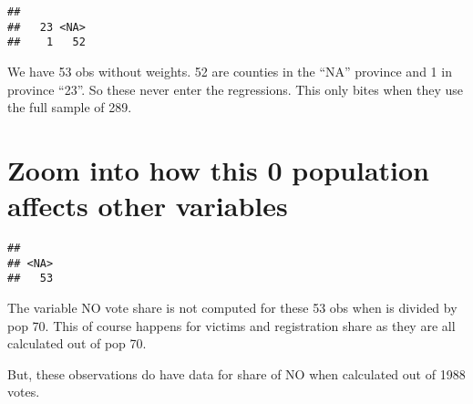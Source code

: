 \documentclass[
]{article}
\newenvironment{Shaded}{\begin{snugshade}}{\end{snugshade}}
\newcommand{\AttributeTok}[1]{\textcolor[rgb]{0.77,0.63,0.00}{#1}}
\newcommand{\DecValTok}[1]{\textcolor[rgb]{0.00,0.00,0.81}{#1}}
\newcommand{\FunctionTok}[1]{\textcolor[rgb]{0.00,0.00,0.00}{#1}}
\newcommand{\NormalTok}[1]{#1}
\newcommand{\SpecialCharTok}[1]{\textcolor[rgb]{0.00,0.00,0.00}{#1}}
\newcommand{\StringTok}[1]{\textcolor[rgb]{0.31,0.60,0.02}{#1}}
\begin{document}
\begin{Shaded}
\end{Shaded}

\begin{verbatim}
## 
##   23 <NA> 
##    1   52
\end{verbatim}

We have 53 obs without weights. 52 are counties in the ``NA'' province
and 1 in province ``23''. So these never enter the regressions. This
only bites when they use the full sample of 289.

\hypertarget{zoom-into-how-this-0-population-affects-other-variables}{%
\section{Zoom into how this 0 population affects other
variables}\label{zoom-into-how-this-0-population-affects-other-variables}}

\begin{Shaded}
\end{Shaded}

\begin{verbatim}
## 
## <NA> 
##   53
\end{verbatim}

The variable NO vote share is not computed for these 53 obs when is
divided by pop 70. This of course happens for victims and registration
share as they are all calculated out of pop 70.

But, these observations do have data for share of NO when calculated out
of 1988 votes.

\begin{Shaded}
\end{Shaded}
\end{document}
